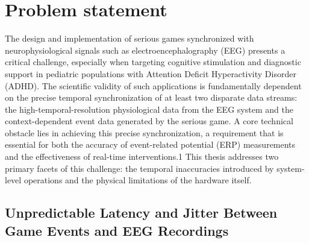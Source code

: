 


\section{Problem statement}
\label{sec:problem} 

The design and implementation of serious games synchronized with neurophysiological signals such as electroencephalography (EEG) presents a critical challenge, especially when targeting cognitive stimulation and diagnostic support in pediatric populations with Attention Deficit Hyperactivity Disorder (ADHD). The scientific validity of such applications is fundamentally dependent on the precise temporal synchronization of at least two disparate data streams: the high-temporal-resolution physiological data from the EEG system and the context-dependent event data generated by the serious game. A core technical obstacle lies in achieving this precise synchronization, a requirement that is essential for both the accuracy of event-related potential (ERP) measurements and the effectiveness of real-time interventions.1 This thesis addresses two primary facets of this challenge: the temporal inaccuracies introduced by system-level operations and the physical limitations of the hardware itself.

\subsection{Unpredictable Latency and Jitter Between Game Events and EEG Recordings}

